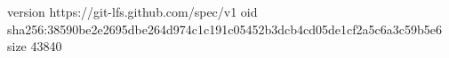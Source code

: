 version https://git-lfs.github.com/spec/v1
oid sha256:38590be2e2695dbe264d974c1c191c05452b3dcb4cd05de1cf2a5c6a3c59b5e6
size 43840
